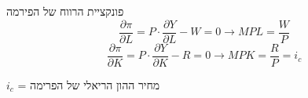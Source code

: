 \documentclass[usenames,dvipsnames]{beamer}
\begin{document}
\begin{RTL}
\begin{frame}
\begin{block}{פונקציית הרווח של הפירמה}
            $$\frac{\partial \pi}{\partial L } = P \cdot \frac{\partial Y}{\partial L} - W = 0 \to MPL = \frac{W}{P}$$
            $$\frac{\partial \pi}{\partial K} = P \cdot \frac{\partial Y}{\partial K} - R = 0 \to MPK = \frac{R}{P} = i_c$$

            $i_c$ = מחיר ההון הריאלי של הפרימה
        \end{block}
        
    
    \end{frame}


\end{RTL}
\end{document}
